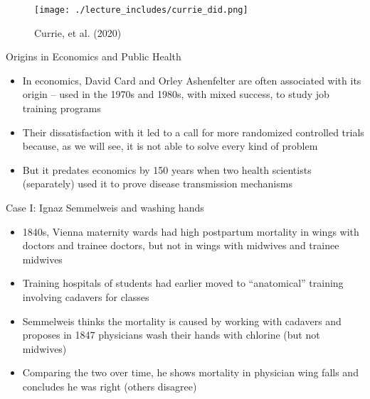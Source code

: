\documentclass{beamer}
\begin{document}
\begin{frame}

	\begin{figure}
	\caption{Currie, et al. (2020)}
	\texttt{[image: ./lecture\_includes/currie\_did.png]}
	\end{figure}


\end{frame}








\begin{frame}{Origins in Economics and Public Health}

\begin{itemize}
\item In economics, David Card and Orley Ashenfelter are often associated with its origin -- used in the 1970s and 1980s, with mixed success, to study job training programs
\item Their dissatisfaction with it led to a call for more randomized controlled trials because, as we will see, it is not able to solve every kind of problem
\item But it predates economics by 150 years when two health scientists (separately) used it to prove disease transmission mechanisms

\end{itemize}

\end{frame}

\begin{frame}{Case I: Ignaz Semmelweis and washing hands}

\begin{itemize}
\item 1840s, Vienna maternity wards had high postpartum mortality in wings with doctors and trainee doctors, but not in wings with midwives and trainee midwives
\item Training hospitals of students had earlier moved to ``anatomical'' training involving cadavers for classes
\item Semmelweis thinks the mortality is caused by working with cadavers and proposes in 1847 physicians wash their hands with chlorine (but not midwives)
\item Comparing the two over time, he shows mortality in physician wing falls and concludes he was right (others disagree)
\end{itemize}

\end{frame}
\end{document}
